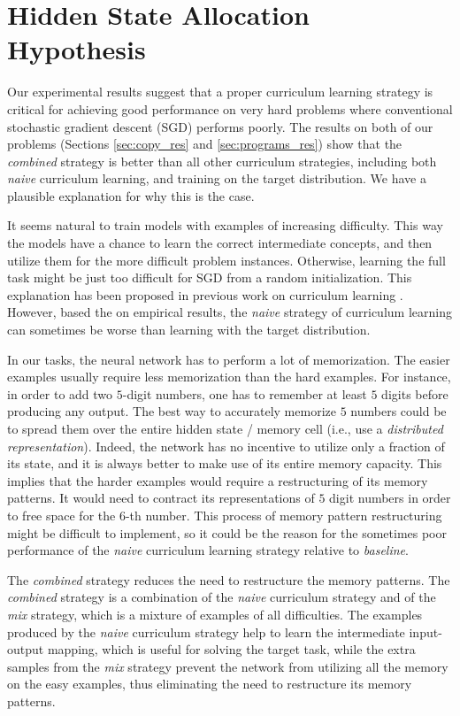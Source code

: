 \section{Hidden State Allocation Hypothesis}

\label{sec:hypothesis}
Our experimental results suggest that a proper curriculum learning strategy is critical for achieving good performance on very hard problems where conventional stochastic gradient descent (SGD) performs poorly. The results on both of our problems (Sections \ref{sec:copy_res} and \ref{sec:programs_res}) show that the \textit{combined} strategy is better than all other curriculum strategies, including both \textit{naive} curriculum learning, and training on the target distribution. We have a plausible explanation for why this is the case.

It seems natural to train models with examples of increasing difficulty. This way the models have a chance to learn the correct intermediate concepts, and then utilize them for the more difficult problem instances. Otherwise, learning the full task might be just too difficult for SGD from a random initialization. This explanation has been proposed in previous work on curriculum learning \cite{bengio2009curriculum}. However, based the on empirical results, the \textit{naive} strategy of curriculum learning can sometimes be worse than learning with the target distribution.

In our tasks, the neural network has to perform a lot of memorization. The easier examples usually require less memorization than the hard examples. For instance, in order to add two $5$-digit numbers, one has to remember at least $5$ digits before producing any output. The best way to accurately memorize $5$ numbers could be to spread them over the entire hidden state / memory cell (i.e., use a \emph{distributed representation}). Indeed, the network has no incentive to utilize only a fraction of its state, and it is always better to make use of its entire memory capacity. This implies that the harder examples would require a restructuring of its memory patterns. It would need to contract its representations of $5$ digit numbers in order to free space for the $6$-th number. This process of memory pattern restructuring might be difficult to implement, so it could be the reason for the sometimes poor performance of the \textit{naive} curriculum learning strategy relative to \textit{baseline}.

The \textit{combined} strategy reduces the need to restructure the memory patterns. The \textit{combined} strategy is a combination of the \textit{naive} curriculum strategy and of the \textit{mix} strategy, which is a mixture of examples of all difficulties. The examples produced by the \textit{naive} curriculum strategy help to learn the intermediate input-output mapping, which is useful for solving the target task, while the extra samples from the \textit{mix} strategy prevent the network from utilizing all the memory on the easy examples, thus  eliminating the need to restructure its memory patterns. 

